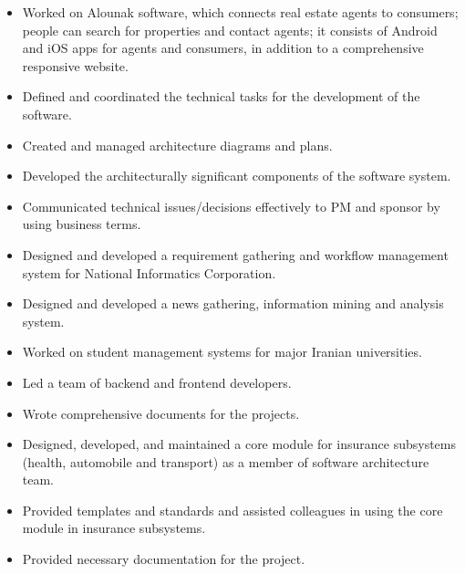\documentclass[10pt,a4paper,ragged2e]{altacv}
\begin{document}
    \divider

    \begin{itemize}
        \item
        {Worked on Alounak software, which connects real estate agents to consumers; people can search for properties and contact agents; it consists of Android and iOS apps for agents and consumers, in addition to a comprehensive responsive website.}
        \item
        {Defined and coordinated the technical tasks for the development of the software.}
        \item
        {Created and managed architecture diagrams and plans.}
        \item
        {Developed the architecturally significant components of the software system.}
        \item
        {Communicated technical issues/decisions effectively to PM and sponsor by using business terms.}
    \end{itemize}

    \divider

    \begin{itemize}
        \item
        {Designed and developed a requirement gathering and workflow management system for National Informatics Corporation.}
        \item
        {Designed and developed a news gathering, information mining and analysis system.}
        \item
        {Worked on student management systems for major Iranian universities.}
        \item
        {Led a team of backend and frontend developers.}
        \item
        {Wrote comprehensive documents for the projects.}
    \end{itemize}

    \divider

    \begin{itemize}
        \item
        {Designed, developed, and maintained a core module for insurance subsystems (health, automobile and transport) as a member of software architecture team.}
        \item
        {Provided templates and standards and assisted colleagues in using the core module in insurance subsystems.}
        \item
        {Provided necessary documentation for the project.}
    \end{itemize}
\end{document}
